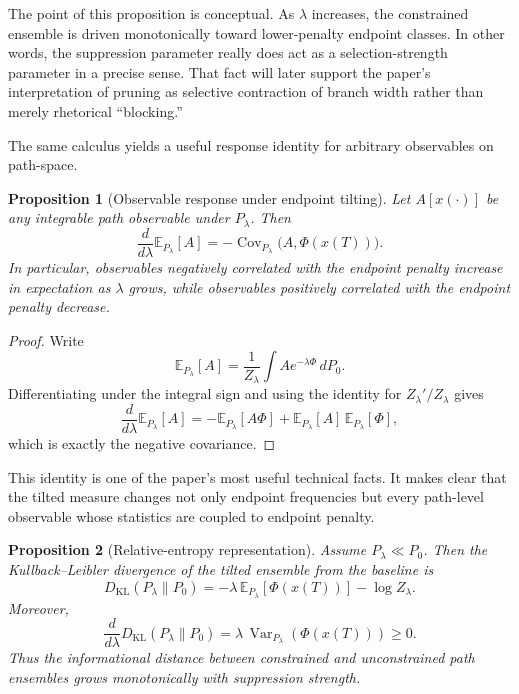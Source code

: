\documentclass[12pt]{article}
\newtheorem{proposition}{Proposition}
\begin{document}
The point of this proposition is conceptual. As $\lambda$ increases, the constrained ensemble is driven monotonically toward lower-penalty endpoint classes. In other words, the suppression parameter really does act as a selection-strength parameter in a precise sense. That fact will later support the paper's interpretation of pruning as selective contraction of branch width rather than merely rhetorical ``blocking.''

The same calculus yields a useful response identity for arbitrary observables on path-space.

\begin{proposition}[Observable response under endpoint tilting]
Let $A[x(\cdot)]$ be any integrable path observable under $P_\lambda$. Then
\[
\frac{d}{d\lambda}\mathbb{E}_{P_\lambda}[A]
= -\operatorname{Cov}_{P_\lambda}\bigl(A,\Phi(x(T))\bigr).
\]
In particular, observables negatively correlated with the endpoint penalty increase in expectation as $\lambda$ grows, while observables positively correlated with the endpoint penalty decrease.
\end{proposition}

\begin{proof}
Write
\[
\mathbb{E}_{P_\lambda}[A] = \frac{1}{Z_\lambda}\int A e^{-\lambda \Phi}\, dP_0.
\]
Differentiating under the integral sign and using the identity for $Z_\lambda'/Z_\lambda$ gives
\[
\frac{d}{d\lambda}\mathbb{E}_{P_\lambda}[A]
= -\mathbb{E}_{P_\lambda}[A\Phi] + \mathbb{E}_{P_\lambda}[A]\,\mathbb{E}_{P_\lambda}[\Phi],
\]
which is exactly the negative covariance.
\end{proof}

This identity is one of the paper's most useful technical facts. It makes clear that the tilted measure changes not only endpoint frequencies but every path-level observable whose statistics are coupled to endpoint penalty.

\begin{proposition}[Relative-entropy representation]
Assume $P_\lambda \ll P_0$. Then the Kullback--Leibler divergence of the tilted ensemble from the baseline is
\[
D_{\mathrm{KL}}(P_\lambda\|P_0)
= -\lambda\,\mathbb{E}_{P_\lambda}[\Phi(x(T))] - \log Z_\lambda.
\]
Moreover,
\[
\frac{d}{d\lambda}D_{\mathrm{KL}}(P_\lambda\|P_0)
= \lambda\,\operatorname{Var}_{P_\lambda}(\Phi(x(T))) \ge 0.
\]
Thus the informational distance between constrained and unconstrained path ensembles grows monotonically with suppression strength.
\end{proposition}
\end{document}
